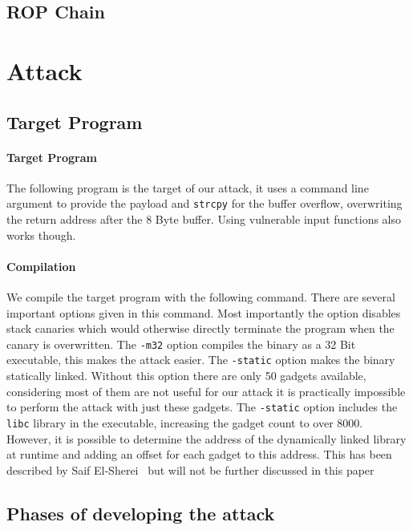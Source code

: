 \documentclass[journal=tosc,submission, notanonymous]{iacrtrans}
\begin{document}
\subsection{ROP Chain}

\section{Attack}
\label{sec:attack}
\subsection{Target Program}
\paragraph{Target Program}
The following program is the target of our attack, it uses a command line argument to provide the payload and \Verb+strcpy+ for the buffer overflow, overwriting the return address after the 8 Byte buffer. Using vulnerable input functions also works though.
\paragraph{Compilation}
We compile the target program with the following command. There are several important options given in this command. Most importantly the  option disables stack canaries which would otherwise directly terminate the program when the canary is overwritten. The \Verb+-m32+ option compiles the binary as a 32 Bit executable, this makes the attack easier. The \Verb+-static+ option makes the binary statically linked. Without this option there are only 50 gadgets available, considering most of them are not useful for our attack it is practically impossible to perform the attack with just these gadgets. The \Verb+-static+ option includes the \Verb+libc+ library in the executable, increasing the gadget count to over 8000. However, it is possible to determine the address of the dynamically linked library at runtime and adding an offset for each gadget to this address. This has been described by Saif El-Sherei~\cite{el-sherei} but will not be further discussed in this paper
\subsection{Phases of developing the attack}
\end{document}
